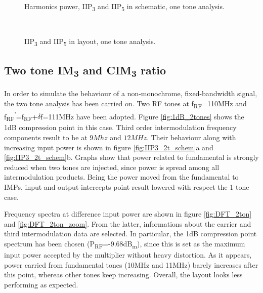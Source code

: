 \begin{figure}[H] 
	\centering
	 \\
	\caption{Harmonics power, IIP\textsubscript{3} and IIP\textsubscript{5} in schematic, one tone analysis.}
	\label{fig:IIP3_1t_schem}
\end{figure}

\begin{figure}[H] 
	\centering
	 \\
	\caption{IIP\textsubscript{3} and IIP\textsubscript{5} in layout, one tone analysis.}
	\label{fig:IIP3_1t_layout}
\end{figure}

\subsection{Two tone IM\textsubscript{3} and CIM\textsubscript{3} ratio}
In order to simulate the behaviour of a non-monochrome, fixed-bandwidth signal, the two tone analysis has been carried on. Two RF tones at f\textsubscript{RF}=110MHz and f\textsubscript{RF}\textsuperscript{'}=f\textsubscript{RF}+\(\delta\)f=111MHz have been adopted.
Figure \ref{fig:1dB_2tones} shows the 1dB compression point in this case.
Third order intermodulation frequency components result to be at \(9Mhz\) and \(12MHz\). Their behaviour along with increasing input power is shown in figure \ref{fig:IIP3_2t_schem}a and \ref{fig:IIP3_2t_schem}b. 
Graphs show that power related to fundamental is strongly reduced when two tones are injected, since power is spread among all intermodulation products. Being the power moved from the fundamental to IMPs, input and output intercepts point result lowered with respect the 1-tone case.

Frequency spectra at difference input power are shown in figure \ref{fig:DFT_2ton} and \ref{fig:DFT_2ton_zoom}. From the latter, informations about the carrier and third intermodulation data are selected. In particular, the 1dB compression point spectrum has been chosen (P\textsubscript{RF}=-9.68dB\textsubscript{m}), since this is set as the maximum input power accepted by the multiplier without heavy distortion. As it appears, power carried from fundamental tones (10MHz and 11MHz) barely increases after this point, whereas other tones keep increasing. Overall, the layout looks less performing as expected.

